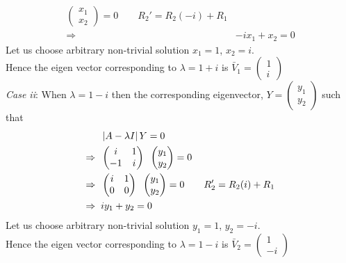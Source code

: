 \documentclass[../main-sheet.tex]{subfiles}
\begin{document}
\begin{soln}
\begin{align*}
\begin{pmatrix}
            x_1\\
            x_2
        \end{pmatrix}=0\qquad R_2'=R_2(-i)+R_1\\
        \Rightarrow\;\;&-ix_1+x_2=0
    \end{align*}
    Let us choose arbitrary non-trivial solution \(x_1=1\), \(x_2=i\).\\
    Hence the eigen vector corresponding to \(\lambda=1+i\) is \(\displaystyle \bar{V}_1=\begin{pmatrix}
        1\\
        i
    \end{pmatrix}\)\\

    \emph{Case ii}: When \(\lambda=1-i\) then the corresponding eigenvector, \(\displaystyle Y=\begin{pmatrix}
        y_1\\
        y_2
    \end{pmatrix}\) such that
    \begin{align*}
        &\left\vert A-\lambda I\right\vert Y=0\\
        \Rightarrow\;\;&\begin{pmatrix}
            i&1\\
            -1&i
        \end{pmatrix}\;\;\begin{pmatrix}
            y_1\\
            y_2
        \end{pmatrix}=0\\
        \Rightarrow\;\;&\begin{pmatrix}
            i&1\\
            0&0
        \end{pmatrix}\;\;\begin{pmatrix}
            y_1\\
            y_2
        \end{pmatrix}=0\qquad R_2'=R_2(i)+R_1\\
        \Rightarrow\;\;&iy_1+y_2=0
    \end{align*}
    Let us choose arbitrary non-trivial solution \(y_1=1\), \(y_2=-i\).\\
    Hence the eigen vector corresponding to \(\lambda=1-i\) is \(\displaystyle \bar{V}_2=\begin{pmatrix}
        1\\
        -i
    \end{pmatrix}\)\\

\end{soln}
\end{document}
